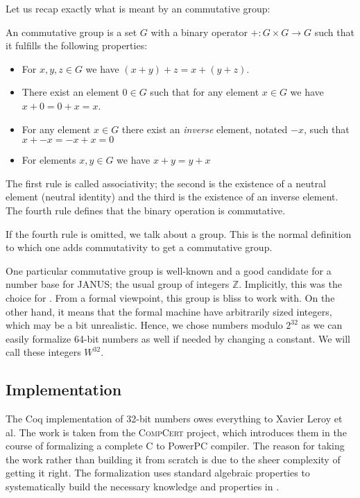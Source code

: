 Let us recap exactly what is meant by an commutative group:
\begin{defn}
  An commutative group is a set $G$ with a binary operator $+\colon G
  \times G \to G$ such that it fulfills the following properties:
  \begin{itemize}
  \item For $x,y,z \in G$ we have $(x + y) + z = x + (y + z)$.
  \item There exist an element $0 \in G$ such that for any element $x
    \in G$ we have $x + 0 = 0 + x = x$.
  \item For any element $x \in G$ there exist an \emph{inverse}
    element, notated $-x$, such that $x + -x = -x + x = 0$
  \item For elements $x, y \in G$ we have $x + y = y + x$
  \end{itemize}
  The first rule is called associativity; the second is the existence
  of a neutral element (neutral identity) and the third is the
  existence of an inverse element. The fourth rule defines that the
  binary operation is commutative.

  If the fourth rule is omitted, we talk about a group. This is the
  normal definition to which one adds commutativity to get a
  commutative group.
\end{defn}

One particular commutative group is well-known and a good candidate
for a number base for JANUS; the usual group of integers
$\mathbb{Z}$. Implicitly, this was the choice for \janusz{}. From a
formal viewpoint, this group is bliss to work with. On the other hand,
it means that the formal machine have arbitrarily sized integers,
which may be a bit unrealistic. Hence, we chose numbers modulo
$2^{32}$ as we can easily formalize 64-bit numbers as well if needed
by changing a constant. We will call these integers $W^{32}$.

\subsection{\coq{} Implementation}

The Coq implementation of 32-bit numbers owes everything to Xavier
Leroy et al. The work is taken from the
\textsc{CompCert} project, which introduces them in the course of
formalizing a complete C to PowerPC compiler. The reason for taking
the work rather than building it from scratch is due to the sheer
complexity of getting it right. The formalization uses standard
algebraic properties to systematically build the necessary knowledge
and properties in \coq{}.

